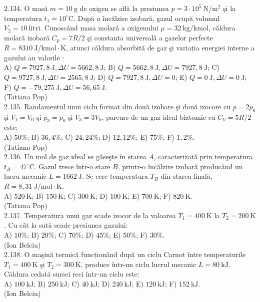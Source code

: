 2.134. O masă $m=10 \mathrm{~g}$ de oxigen se află la presiunea $p=3 \cdot 10^{5} \mathrm{~N} / \mathrm{m}^{2}$ şi la temperatura $t_{1}=10^{\circ} \mathrm{C}$. După o încălzire izobară, gazul ocupă volumul $V_{2}=10 \mathrm{~litri}$. Cunoscând masa molară a oxigenului $\mu=32 \mathrm{~kg} / \mathrm{kmol}$, căldura molară izobară $C_{p}=7 R / 2$ şi constanta universală a gazelor perfecte $R=8310 \mathrm{~J} / \mathrm{kmol} \cdot \mathrm{K}$, atunci căldura absorbită de gaz şi variația energiei interne a gazului au valorile :\\ A) $Q=7927,8 \mathrm{~J}, \Delta U=5662,8 \mathrm{~J}$; B) $Q=5662,8 \mathrm{~J}, \Delta U=7927,8 \mathrm{~J}$; C) $Q=9727,8 \mathrm{~J}, \Delta U=2565,8 \mathrm{~J}$; D) $Q=7927,8 \mathrm{~J}, \Delta U=0$; E) $Q=0 \mathrm{~J}, \Delta U=0 \mathrm{~J}$; F) $Q=-79,275 \mathrm{~J}, \Delta U=56,65 \mathrm{~J}$.\\ (Tatiana Pop)\\

2.135. Randamentul unui ciclu format din două izobare şi două izocore cu $p=2 p_{0}$ şi $V_{1}=V_{0}$ şi $p_{3}=p_{0}$ şi $V_{3}=3 V_{0}$, parcurs de un gaz ideal biatomic cu $C_{V}=5 R / 2$ este:\\ A) $50 \%$; B) $36,4 \%$; C) $24,24 \%$; D) $12,12 \%$; E) $75 \%$; F) $1,2 \%$.\\ (Tatiana Pop)\\

2.136. Un mol de gaz ideal se găseşte în starea $A$, caracterizată prin temperatura $t_{A}=47^{\circ} \mathrm{C}$. Gazul trece într-o stare $B$, printr-o încălzire izobară producând un lucru mecanic $L=1662 \mathrm{~J}$. Se cere temperatura $T_{B}$ din starea finală, $R=8,31 \mathrm{~J} / \mathrm{mol} \cdot \mathrm{K}$.\\ A) $520 \mathrm{~K}$; B) $150 \mathrm{~K}$; C) $300 \mathrm{~K}$; D) $100 \mathrm{~K}$; E) $700 \mathrm{~K}$; F) $820 \mathrm{~K}$.\\ (Tatiana Pop)\\

2.137. Temperatura unui gaz scade izocor de la valoarea $T_{1}=400 \mathrm{~K}$ la $T_{2}=200 \mathrm{~K}$. Cu cât la sută scade presiunea gazului:\\ A) $10 \%$; B) $20 \%$; C) $70 \%$; D) $45 \%$; E) $50 \%$; F) $30 \%$.\\ (Ion Belciu)\\

2.138. O maşină termică funcționând după un ciclu Carnot între temperaturile $T_{1}=400 \mathrm{~K}$ şi $T_{2}=300 \mathrm{~K}$, produce într-un ciclu lucrul mecanic $L=80 \mathrm{~kJ}$. Căldura cedată sursei reci într-un ciclu este:\\ A) $100 \mathrm{~kJ}$; B) $250 \mathrm{~kJ}$; C) $40 \mathrm{~kJ}$; D) $240 \mathrm{~kJ}$; E) $120 \mathrm{~kJ}$; F) $152 \mathrm{~kJ}$.\\ (Ion Belciu)\\

